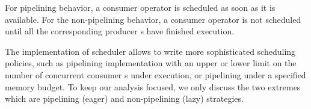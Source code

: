 For pipelining behavior, a consumer operator \wo{} is scheduled as soon as it is available.
For the non-pipelining behavior, a consumer operator \wo{} is not scheduled until all the corresponding producer \wo{}s have finished execution. 

The implementation of \sys{} scheduler allows to write more sophisticated scheduling policies, such as pipelining implementation with an upper or lower limit on the number of concurrent consumer \wo{}s under execution, or pipelining under a specified memory budget.
To keep our analysis focused, we only discuss the two extremes which are pipelining (eager) and non-pipelining (lazy) strategies.